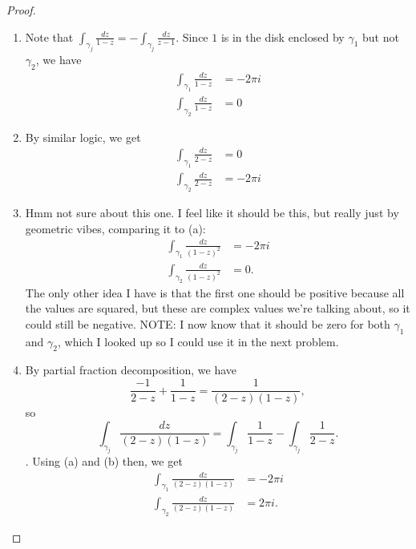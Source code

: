 \documentclass[12pt]{article}
\theoremstyle{definition}
\begin{document}
\begin{proof}
	\begin{enumerate}[label=(\alph*)]
		\item Note that $\int_{\gamma_j} \frac{dz}{1-z} = - \int_{\gamma_j} \frac{dz}{z-1}$.
		      Since $1$ is in the disk enclosed by $\gamma_1$ but not $\gamma_2$, we have \begin{align*}
			      \int_{\gamma_1} \frac{dz}{1-z} & = -2\pi i \\
			      \int_{\gamma_2} \frac{dz}{1-z} & = 0
		      \end{align*}
		\item By similar logic, we get \begin{align*}
			      \int_{\gamma_1} \frac{dz}{2-z} & = 0       \\
			      \int_{\gamma_2} \frac{dz}{2-z} & = -2\pi i
		      \end{align*}
		\item  Hmm not sure about this one.
		      I feel like it should be this, but really just by geometric vibes, comparing it to (a): \begin{align*}
			      \int_{\gamma_1} \frac{dz}{(1-z)^2} & = -2\pi i \\
			      \int_{\gamma_2} \frac{dz}{(1-z)^2} & = 0.
		      \end{align*}
		      The only other idea I have is that the first one should be positive because all the values are squared, but these are complex values we're talking about, so it could still be negative.
		      NOTE: I now know that it should be zero for both $\gamma_1$ and $\gamma_2$, which I looked up so I could use it in the next problem.
		\item  By partial fraction decomposition, we have \begin{equation*}
			      \frac{-1}{2-z} + \frac{1}{1-z} = \frac{1}{(2-z)(1-z)},
		      \end{equation*}
		      so \begin{equation*}
			      \int_{\gamma_j} \frac{dz}{(2-z)(1-z)} = \int_{\gamma_j}\frac{1}{1-z}-\int_{\gamma_j} \frac{1}{2-z}.
		      \end{equation*}.
		      Using (a) and (b) then, we get \begin{align*}
			      \int_{\gamma_1} \frac{dz}{(2-z)(1-z)} & = -2\pi i \\
			      \int_{\gamma_2} \frac{dz}{(2-z)(1-z)} & = 2\pi i.
		      \end{align*}
	\end{enumerate}
\end{proof}
\end{document}
